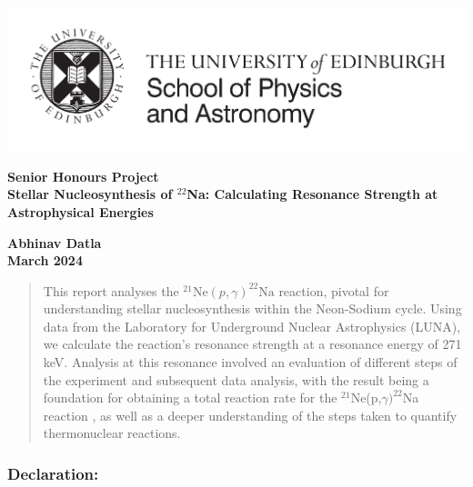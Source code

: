 \documentclass[a4paper,12pt]{article}
\def\reac{$^{21}$Ne(p,$\gamma)^{22}$Na reaction }
\begin{document}
\pagestyle{empty}                       %

\par\noindent\includegraphics[width=14cm]{PandA_crest.jpg}

\par\noindent                                           %
\vspace*{1cm}
\begin{center}
        \bf Senior Honours Project\\
        \Large\bf Stellar Nucleosynthesis of $^{22}$Na: Calculating Resonance Strength at Astrophysical Energies          %
\end{center}
\vspace*{0.5cm}
\begin{center}
        \bf Abhinav Datla\\                               %
        March 2024                                   %
\end{center}
\vspace*{5mm}
%
\begin{abstract}
This report analyses the \( ^{21}\text{Ne}(p,\gamma)^{22}\text{Na}\) reaction, pivotal for understanding stellar nucleosynthesis within the Neon-Sodium cycle. Using data from the Laboratory for Underground Nuclear Astrophysics (LUNA), we calculate the reaction's resonance strength at a resonance energy of 271 keV. Analysis at this resonance involved an evaluation of different steps of the experiment and subsequent data analysis, with the result being a foundation for obtaining a total reaction rate for the \reac, as well as a deeper understanding of the steps taken to quantify thermonuclear reactions.
\end{abstract}

\vspace*{1cm}

\subsubsection*{Declaration:}
\end{document}
